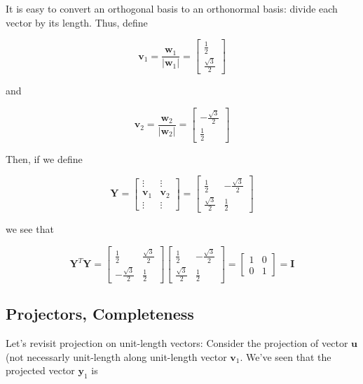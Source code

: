 \documentclass[main.tex]{subfiles}
\begin{document}
It is easy to convert an orthogonal basis to an orthonormal basis: divide each vector by its length. Thus, define

$$
\mathbf{v}_{1}=\frac{\mathbf{w}_{1}}{\left|\mathbf{w}_{1}\right|}=\left[\begin{array}{r}
\frac{1}{2} \\
\frac{\sqrt{3}}{2}
\end{array}\right]
$$

and

$$
\mathbf{v}_{2}=\frac{\mathbf{w}_{2}}{\left|\mathbf{w}_{2}\right|}=\left[\begin{array}{c}
-\frac{\sqrt{3}}{2} \\
\frac{1}{2}
\end{array}\right]
$$

Then, if we define

$$
\mathbf{Y}=\left[\begin{array}{cc}
\vdots & \vdots \\
\mathbf{v}_{1} & \mathbf{v}_{2} \\
\vdots & \vdots
\end{array}\right]=\left[\begin{array}{cc}
\frac{1}{2} & -\frac{\sqrt{3}}{2} \\
\frac{\sqrt{3}}{2} & \frac{1}{2}
\end{array}\right]
$$

we see that

$$
\mathbf{Y}^{T} \mathbf{Y}=\left[\begin{array}{cc}
\frac{1}{2} & \frac{\sqrt{3}}{2} \\
-\frac{\sqrt{3}}{2} & \frac{1}{2}
\end{array}\right]\left[\begin{array}{cc}
\frac{1}{2} & -\frac{\sqrt{3}}{2} \\
\frac{\sqrt{3}}{2} & \frac{1}{2}
\end{array}\right]=\left[\begin{array}{ll}
1 & 0 \\
0 & 1
\end{array}\right]=\mathbf{I}
$$

\subsection{Projectors, Completeness}

Let's revisit projection on unit-length vectors: Consider the projection of vector $\mathbf{u}$ (not necessarly unit-length along unit-length vector $\mathbf{v}_{1}$. We've seen that the projected vector $\mathbf{y}_{1}$ is
\end{document}
